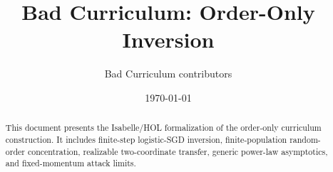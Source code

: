 \documentclass[11pt,a4paper]{article}
\title{Bad Curriculum: Order-Only Inversion}
\author{Bad Curriculum contributors}
\date{\today}
\begin{document}
\maketitle

\begin{abstract}
This document presents the Isabelle/HOL formalization of the order-only
curriculum construction. It includes finite-step logistic-SGD inversion,
finite-population random-order concentration, realizable two-coordinate
transfer, generic power-law asymptotics, and fixed-momentum attack limits.
\end{abstract}

\tableofcontents


\end{document}
